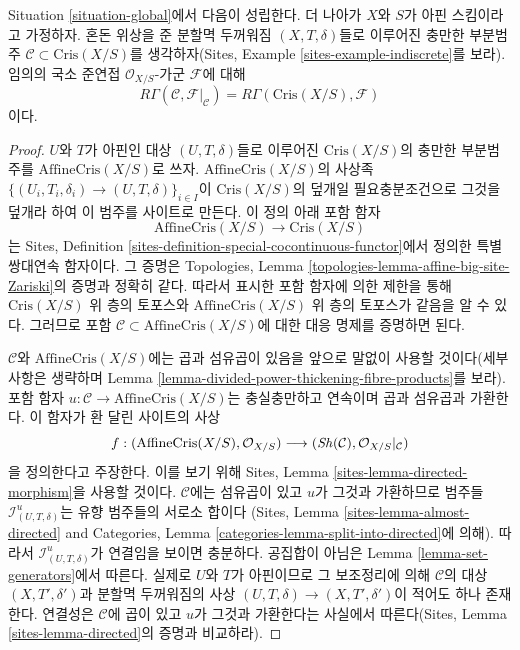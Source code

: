 \begin{lemma}
\label{lemma-compare}
Situation \ref{situation-global}에서 다음이 성립한다.
더 나아가 $X$와 $S$가 아핀 스킴이라고 가정하자. 혼돈 위상을 준
분할멱 두꺼워짐 $(X, T, \delta)$들로 이루어진 충만한 부분범주
$\mathcal{C} \subset \text{Cris}(X/S)$를 생각하자(Sites, Example
\ref{sites-example-indiscrete}를 보라). 임의의 국소 준연접
$\mathcal{O}_{X/S}$-가군 $\mathcal{F}$에 대해
$$
R\Gamma(\mathcal{C}, \mathcal{F}|_\mathcal{C}) =
R\Gamma(\text{Cris}(X/S), \mathcal{F})
$$
이다.
\end{lemma}

\begin{proof}
$U$와 $T$가 아핀인 대상 $(U, T, \delta)$들로 이루어진
$\text{Cris}(X/S)$의 충만한 부분범주를
$\text{AffineCris}(X/S)$로 쓰자. $\text{AffineCris}(X/S)$의 사상족
$\{(U_i, T_i, \delta_i) \to (U, T, \delta)\}_{i \in I}$이
$\text{Cris}(X/S)$의 덮개일 필요충분조건으로 그것을 덮개라 하여
이 범주를 사이트로 만든다. 이 정의 아래 포함 함자
$$
\text{AffineCris}(X/S) \longrightarrow \text{Cris}(X/S)
$$
는 Sites, Definition
\ref{sites-definition-special-cocontinuous-functor}에서 정의한 특별
쌍대연속 함자이다. 그 증명은 Topologies, Lemma
\ref{topologies-lemma-affine-big-site-Zariski}의 증명과 정확히 같다.
따라서 표시한 포함 함자에 의한 제한을 통해
$\text{Cris}(X/S)$ 위 층의 토포스와
$\text{AffineCris}(X/S)$ 위 층의 토포스가 같음을 알 수 있다.
그러므로 포함 $\mathcal{C} \subset \text{AffineCris}(X/S)$에 대한
대응 명제를 증명하면 된다.

\medskip\noindent
$\mathcal{C}$와 $\text{AffineCris}(X/S)$에는 곱과 섬유곱이 있음을
앞으로 말없이 사용할 것이다(세부사항은 생략하며 Lemma
\ref{lemma-divided-power-thickening-fibre-products}를 보라).
포함 함자 $u : \mathcal{C} \to \text{AffineCris}(X/S)$는
충실충만하고 연속이며 곱과 섬유곱과 가환한다. 이 함자가 환 달린
사이트의 사상
$$
f :
(\text{AffineCris}(X/S), \mathcal{O}_{X/S})
\longrightarrow
(\mathop{\mathit{Sh}}\nolimits(\mathcal{C}), \mathcal{O}_{X/S}|_\mathcal{C})
$$
을 정의한다고 주장한다. 이를 보기 위해 Sites, Lemma
\ref{sites-lemma-directed-morphism}을 사용할 것이다.
$\mathcal{C}$에는 섬유곱이 있고 $u$가 그것과 가환하므로 범주들
$\mathcal{I}^u_{(U, T, \delta)}$는 유향 범주들의 서로소 합이다
(Sites, Lemma \ref{sites-lemma-almost-directed} and Categories, Lemma
\ref{categories-lemma-split-into-directed}에 의해). 따라서
$\mathcal{I}^u_{(U, T, \delta)}$가 연결임을 보이면 충분하다.
공집합이 아님은 Lemma \ref{lemma-set-generators}에서 따른다.
실제로 $U$와 $T$가 아핀이므로 그 보조정리에 의해
$\mathcal{C}$의 대상 $(X, T', \delta')$과 분할멱 두꺼워짐의 사상
$(U, T, \delta) \to (X, T', \delta')$이 적어도 하나 존재한다.
연결성은 $\mathcal{C}$에 곱이 있고 $u$가 그것과 가환한다는
사실에서 따른다(Sites, Lemma \ref{sites-lemma-directed}의 증명과
비교하라).


\end{proof}
